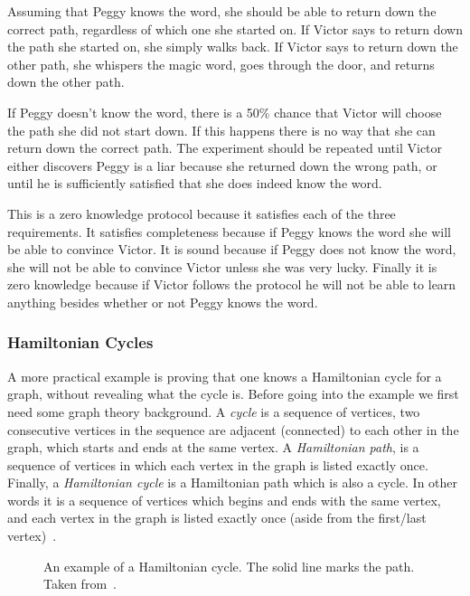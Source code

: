 \documentclass{sig-alternate}
\begin{document}
	Assuming that Peggy knows the word, she should be able to return down
	the correct path, regardless of which one she started on. If Victor 
	says to	return down the path she started on, she simply walks back. 
	If Victor says to return down the other path, she whispers the magic
	word, goes through the door, and returns down the other path.

	If Peggy doesn't know the word, there is a 50\% chance that Victor
	will choose the path she did not start down. If this happens there is
	no way that she can return down the correct path. The experiment should
	be repeated until Victor either discovers Peggy is a liar because she
	returned down the wrong path, or until he is sufficiently satisfied
	that she does indeed know the word.

	This is a zero knowledge protocol because it satisfies each of the three
	requirements. It satisfies completeness because	if Peggy knows the word
	she will be able to convince Victor. It is sound because if Peggy does not 
	know the word, she will not be able to convince Victor unless she was very
	lucky. Finally it is zero knowledge because if Victor follows the protocol
	he will not be able to learn anything besides whether or not Peggy knows 
	the word.
	
	\subsubsection{Hamiltonian Cycles}
	A more practical example is proving that one knows a Hamiltonian
	cycle for a graph, without revealing what the cycle is. Before
	going into the example we first need some graph theory background.
	A \textit{cycle} is a sequence of vertices, two consecutive vertices
	in the sequence are	adjacent (connected) to each other in the graph,
	which starts and ends at the same vertex. A \textit{Hamiltonian
	path}, is a sequence of vertices in which each vertex in the graph is
	listed exactly once. Finally, a \textit{Hamiltonian cycle}
	is a Hamiltonian path which is also a cycle. In other words it is a
	sequence of vertices which begins and ends with the same vertex, and
	each vertex in the graph is listed exactly once (aside from the first/last
	vertex)~\cite{Wiki:Hamiltonian}.
	
	\begin{figure}
	\centering
	\caption{An example of a Hamiltonian cycle. The solid line marks the path.
	Taken from~\cite{Wiki:Hamiltonian}.}
	\label{fig:HCycle}
	\end{figure}
	
\end{document}
